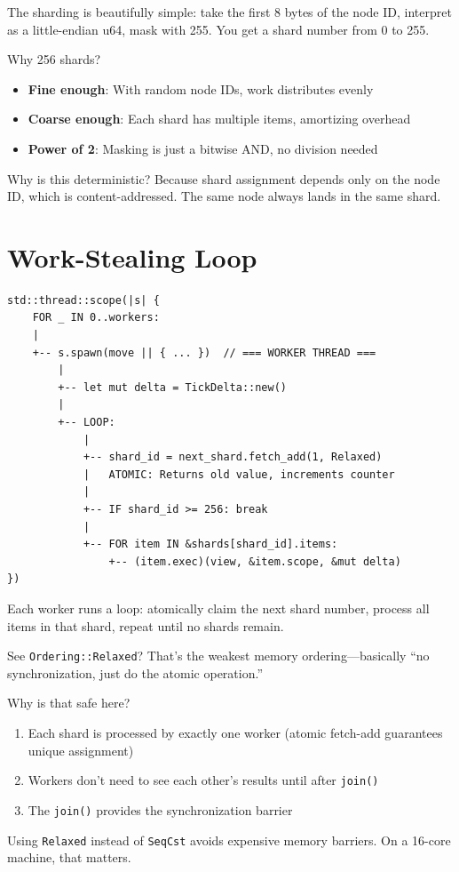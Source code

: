 \begin{commentary}
The sharding is beautifully simple: take the first 8 bytes of the node ID, interpret as a little-endian u64, mask with 255. You get a shard number from 0 to 255.

Why 256 shards?
\begin{itemize}
    \item \textbf{Fine enough}: With random node IDs, work distributes evenly
    \item \textbf{Coarse enough}: Each shard has multiple items, amortizing overhead
    \item \textbf{Power of 2}: Masking is just a bitwise AND, no division needed
\end{itemize}

Why is this deterministic? Because shard assignment depends only on the node ID, which is content-addressed. The same node always lands in the same shard.
\end{commentary}

\section{Work-Stealing Loop}

\begin{verbatim}
std::thread::scope(|s| {
    FOR _ IN 0..workers:
    |
    +-- s.spawn(move || { ... })  // === WORKER THREAD ===
        |
        +-- let mut delta = TickDelta::new()
        |
        +-- LOOP:
            |
            +-- shard_id = next_shard.fetch_add(1, Relaxed)
            |   ATOMIC: Returns old value, increments counter
            |
            +-- IF shard_id >= 256: break
            |
            +-- FOR item IN &shards[shard_id].items:
                +-- (item.exec)(view, &item.scope, &mut delta)
})
\end{verbatim}

\begin{commentary}
Each worker runs a loop: atomically claim the next shard number, process all items in that shard, repeat until no shards remain.

See \texttt{Ordering::Relaxed}? That's the weakest memory ordering---basically ``no synchronization, just do the atomic operation.''

Why is that safe here?
\begin{enumerate}
    \item Each shard is processed by exactly one worker (atomic fetch-add guarantees unique assignment)
    \item Workers don't need to see each other's results until after \texttt{join()}
    \item The \texttt{join()} provides the synchronization barrier
\end{enumerate}

Using \texttt{Relaxed} instead of \texttt{SeqCst} avoids expensive memory barriers. On a 16-core machine, that matters.
\end{commentary}

